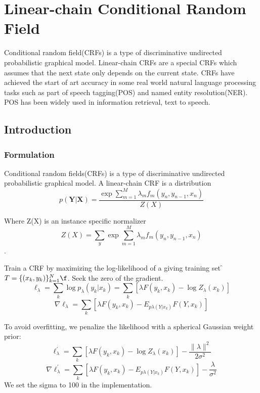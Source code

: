 
\chapter[Linear-chain Conditional Random Field]{Linear-chain Conditional Random Field}
Conditional random field(CRFs) is a type of discriminative undirected probabilistic graphical model.
Linear-chain CRFs are a special CRFs which assumes that the next state only depends on the current state. 
CRFs have achieved the start of art accuracy in some real world natural language processing tasks such
as part of speech tagging(POS) and named entity resolution(NER). POS has been widely used in information retrieval, 
text to speech.

\section{Introduction}

\subsection{Formulation}
Conditional random fields(CRFs) is a type of discriminative undirected probabilistic graphical model.
A linear-chain CRF is a distribution
    \[p(\boldsymbol Y | \boldsymbol X) = \frac{\exp{\sum_{m=1}^M \lambda_m f_m(y_n,y_{n-1},x_n)}}{Z(X)}\]

Where Z(X) is an instance specific normalizer
\[Z(X) = \sum_{y} \exp{\sum_{m=1}^M \lambda_m f_m(y_n,y_{n-1},x_n)}\].

Train a CRF by maximizing the log-likelihood of a giving training set \f$ T=\{(x_k,y_k)\}_{k=1}^N \f$.
Seek the zero of the gradient.\\
    \[\ell_{\lambda}=\sum_k \log p_\lambda(y_k|x_k) =\sum_k[\lambda F(y_k,x_k)-\log Z_\lambda(x_k)]\]
    \[\nabla \ell_{\lambda}=\sum_k[\lambda F(y_k,x_k)-E_{p\lambda(Y|x_k)}F(Y,x_k)]\]

To avoid overfitting, we penalize the likelihood with a spherical Gaussian weight prior:\\
    \[\ell_{\lambda}^\prime=\sum_k[\lambda F(y_k,x_k)-\log Z_\lambda(x_k)]-\frac{\lVert \lambda \rVert^2}{2\sigma ^2}\]
    \[\nabla \ell_{\lambda}^\prime=\sum_k[\lambda F(y_k,x_k)-E_{p\lambda(Y|x_k)}F(Y,x_k)]-\frac{\lambda}{\sigma ^2}\]
We set the sigma to 100 in the implementation.

